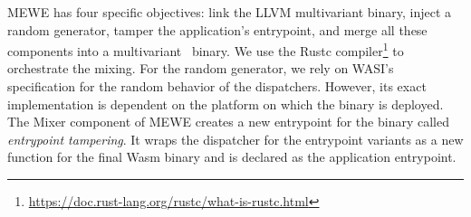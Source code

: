 
MEWE has four specific objectives: link the LLVM multivariant binary, inject a random generator, tamper the application's entrypoint, and merge all these components into a multivariant \wasm\ binary.
We use the Rustc compiler\footnote{\url{https://doc.rust-lang.org/rustc/what-is-rustc.html}} to orchestrate the mixing.
For the random generator, we rely on WASI's specification \cite{WASI} for the random behavior of the dispatchers. 
However, its exact implementation is dependent on the platform on which the binary is deployed.
The Mixer component of MEWE creates a new entrypoint for the binary called \emph{entrypoint tampering}.
It wraps the dispatcher for the entrypoint variants as a new function for the final Wasm binary and is declared as the application entrypoint. 


